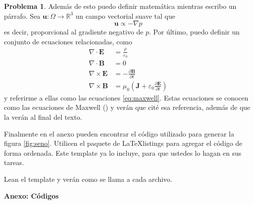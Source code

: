 \documentclass[10pt]{article}
\theoremstyle{definition}
\theoremstyle{remark}
\theoremstyle{definition}
\newtheorem{prob}{Problema}
\newcommand{\pd}[2]{\frac{\partial #1}{ \partial #2}}   %
\renewcommand{\vec}[1]{\boldsymbol{#1}}
\newcommand{\R}{\mathbb{R}}
\begin{document}
\begin{prob}
Además de esto puedo definir matemática mientras escribo un párrafo. Sea $\vec{u} : \Omega \to \R^{3}$ un campo vectorial suave tal que
\begin{equation}
	\vec{u} \propto -\nabla p
\end{equation}
es decir, proporcional al gradiente negativo de $p$. Por último, puedo definir un conjunto de ecuaciones relacionadas, como
\begin{subequations}
	\label{eq:maxwell}
	\begin{align}
		\nabla \cdot \vec{E} & = \frac{\rho}{\varepsilon_{0}} \\
		\nabla \cdot \vec{B} & = 0 \\
		\nabla \times \vec{E} & = -\pd{\vec{B}}{t} \\
		\nabla \times \vec{B} & = \mu_{0} \left( \vec{J} + \varepsilon_{0} \pd{\vec{E}}{t} \right)
	\end{align}
\end{subequations}
y referirme a ellas como las ecuaciones \eqref{eq:maxwell}. Estas ecuaciones se conocen como las ecuaciones de Maxwell (\cite{wikipedia}) y verán que cité esa referencia, además de que la verán al final del texto.

Finalmente en el anexo pueden encontrar el código utilizado para generar la figura \ref{fig:seno}. Utilicen el paquete de \LaTeX listings para agregar el código de forma ordenada. Este template ya lo incluye, para que ustedes lo hagan en sus tareas.

Lean el template y verán como se llama a cada archivo.

\end{prob}

\newpage

\printbibliography

\newpage

\twocolumn
\begin{center}
	\textbf{Anexo: Códigos}
\end{center}


\end{document}
